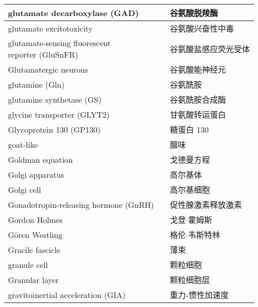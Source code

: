 \begin{longtable}{lll}
	\midrule
	glutamate decarboxylase (GAD)    &&  谷氨酸脱羧酶  \\
	
	\midrule
	glutamate excitotoxicity     &&  谷氨酸兴奋性中毒  \\
	
	\midrule
	\makecell[l]{glutamate-sensing fluorescent \\ reporter (GluSnFR) }   &&  谷氨酸盐感应荧光受体  \\
	
	\midrule
	Glutamatergic neurons     &&  谷氨酸能神经元  \\
	
	\midrule
	glutamine (Gln)  &&  谷氨酰胺  \\
	
	\midrule
	glutamine synthetase  (GS)   &&  谷氨酰胺合成酶  \\
	
	\midrule
	glycine transporter (GLYT2)   &&  甘氨酸转运蛋白  \\
	
	\midrule
	Glycoprotein 130 (GP130)    &&  糖蛋白 130  \\
	
	\midrule
	goat-like     &&  	膻味  \\
	
	\midrule
	Goldman equation     &&  	戈德曼方程  \\
	
	\midrule
	Golgi apparatus     &&  	高尔基体  \\
	
	\midrule
	Golgi cell     &&  	高尔基细胞  \\
	
	\midrule
	Gonadotropin-releasing hormone (GnRH)    &&  	促性腺激素释放激素  \\
	
	\midrule
	Gordon Holmes   &&  	戈登$\cdot$霍姆斯  \\
	
	\midrule
	Gören Westling   &&  	格伦$\cdot$韦斯特林  \\
	
	\midrule
	Gracile fascicle     &&  	薄束  \\
	
	\midrule
	granule cell     &&  	颗粒细胞  \\
	
	\midrule
	Granular layer     &&  	颗粒细胞层  \\
	
	\midrule
	gravitoinertial acceleration (GIA)     &&  	重力-惯性加速度  \\
	

\end{longtable}
